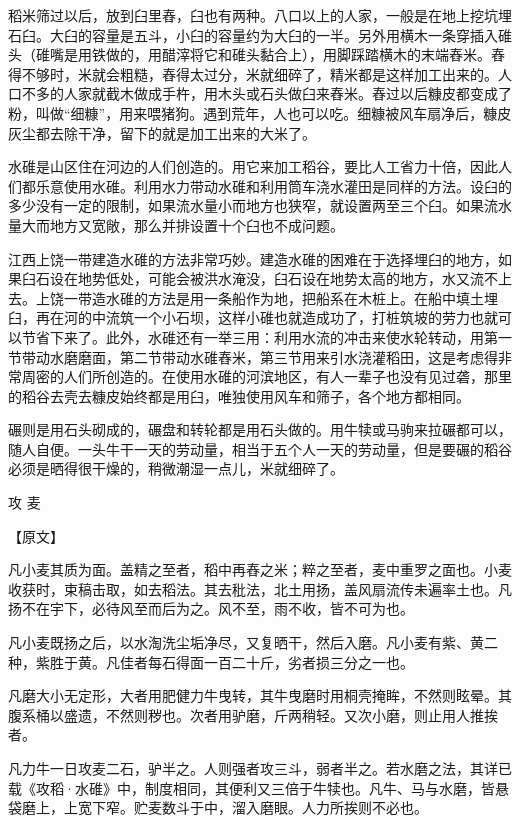 \documentclass[12pt,UTF8]{ctexbook}
\begin{document}
稻米筛过以后，放到臼里舂，臼也有两种。八口以上的人家，一般是在地上挖坑埋石臼。大臼的容量是五斗，小臼的容量约为大臼的一半。另外用横木一条穿插入碓头（碓嘴是用铁做的，用醋滓将它和碓头黏合上），用脚踩踏横木的末端舂米。舂得不够时，米就会粗糙，舂得太过分，米就细碎了，精米都是这样加工出来的。人口不多的人家就截木做成手杵，用木头或石头做臼来舂米。舂过以后糠皮都变成了粉，叫做“细糠”，用来喂猪狗。遇到荒年，人也可以吃。细糠被风车扇净后，糠皮灰尘都去除干净，留下的就是加工出来的大米了。

水碓是山区住在河边的人们创造的。用它来加工稻谷，要比人工省力十倍，因此人们都乐意使用水碓。利用水力带动水碓和利用筒车浇水灌田是同样的方法。设臼的多少没有一定的限制，如果流水量小而地方也狭窄，就设置两至三个臼。如果流水量大而地方又宽敞，那么并排设置十个臼也不成问题。

江西上饶一带建造水碓的方法非常巧妙。建造水碓的困难在于选择埋臼的地方，如果臼石设在地势低处，可能会被洪水淹没，臼石设在地势太高的地方，水又流不上去。上饶一带造水碓的方法是用一条船作为地，把船系在木桩上。在船中填土埋臼，再在河的中流筑一个小石坝，这样小碓也就造成功了，打桩筑坡的劳力也就可以节省下来了。此外，水碓还有一举三用：利用水流的冲击来使水轮转动，用第一节带动水磨磨面，第二节带动水碓舂米，第三节用来引水浇灌稻田，这是考虑得非常周密的人们所创造的。在使用水碓的河滨地区，有人一辈子也没有见过砻，那里的稻谷去壳去糠皮始终都是用臼，唯独使用风车和筛子，各个地方都相同。

碾则是用石头砌成的，碾盘和转轮都是用石头做的。用牛犊或马驹来拉碾都可以，随人自便。一头牛干一天的劳动量，相当于五个人一天的劳动量，但是要碾的稻谷必须是晒得很干燥的，稍微潮湿一点儿，米就细碎了。

攻 麦

【原文】

凡小麦其质为面。盖精之至者，稻中再舂之米；粹之至者，麦中重罗之面也。小麦收获时，束稿击取，如去稻法。其去秕法，北土用扬，盖风扇流传未遍率土也。凡扬不在宇下，必待风至而后为之。风不至，雨不收，皆不可为也。

凡小麦既扬之后，以水淘洗尘垢净尽，又复晒干，然后入磨。凡小麦有紫、黄二种，紫胜于黄。凡佳者每石得面一百二十斤，劣者损三分之一也。

凡磨大小无定形，大者用肥健力牛曳转，其牛曳磨时用桐壳掩眸，不然则眩晕。其腹系桶以盛遗，不然则秽也。次者用驴磨，斤两稍轻。又次小磨，则止用人推挨者。

凡力牛一日攻麦二石，驴半之。人则强者攻三斗，弱者半之。若水磨之法，其详已载《攻稻·水碓》中，制度相同，其便利又三倍于牛犊也。凡牛、马与水磨，皆悬袋磨上，上宽下窄。贮麦数斗于中，溜入磨眼。人力所挨则不必也。
\end{document}
